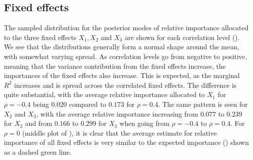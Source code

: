 \subsection{Fixed effects}
The sampled distribution for the posterior modes of relative importance allocated to the three fixed effects $X_1, X_2$ and $X_3$ are shown for each correlation level (). We see that the distributions generally form a normal shape around the mean, with somewhat varying spread. As correlation levels go from negative to positive, meaning that the variance contribution from the fixed effects increase, the importances of the fixed effects also increase. This is expected, as the marginal $R^2$ increases and is spread across the correlated fixed effects. The difference is quite substantial, with the average relative importance allocated to $X_1$ for $\rho=-0.4$ being $0.020$ compared to $0.173$ for $\rho=0.4$. The same pattern is seen for $X_2$ and $X_3$, with the average relative importance increasing from $0.077$ to $0.239$ for $X_2$ and from $0.166$ to $0.299$ for $X_3$ when going from $\rho=-0.4$ to $\rho=0.4$. For $\rho=0$ (middle plot of ), it is clear that the average estimate for relative importance of all fixed effects is very similar to the expected importance () shown as a dashed green line. 
\\
\\
